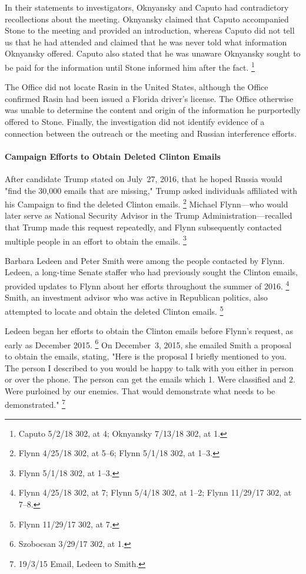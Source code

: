 In their statements to investigators, Oknyansky and Caputo had contradictory recollections about the meeting.
Oknyansky claimed that Caputo accompanied Stone to the meeting and provided an introduction, whereas Caputo did not tell us that he had attended and claimed that he was never told what information Oknyansky offered.
Caputo also stated that he was unaware Oknyansky sought to be paid for the information until Stone informed him after the fact.%
\footnote{Caputo 5/2/18 302, at 4;
Oknyansky 7/13/18 302, at 1.}

The Office did not locate Rasin in the United States, although the Office confirmed Rasin had been issued a  Florida driver's license.
The Office otherwise was unable to determine the content and origin of the information he purportedly offered to Stone.
Finally, the investigation did not identify evidence of a connection between the outreach or the meeting and Russian interference efforts.

\paragraph{Campaign Efforts to Obtain Deleted Clinton Emails}

After candidate Trump stated on July~27, 2016, that he hoped Russia would "find the 30,000 emails that are missing," Trump asked individuals affiliated with his Campaign to find the deleted Clinton emails.%
\footnote{Flynn 4/25/18 302, at 5--6;
Flynn 5/1/18 302, at 1--3.}
Michael Flynn---who would later serve as National Security Advisor in the Trump Administration---recalled that Trump made this request repeatedly, and Flynn subsequently contacted multiple people in an effort to obtain the emails.%
\footnote{Flynn 5/1/18 302, at 1--3.}

Barbara Ledeen and Peter Smith were among the people contacted by Flynn.
Ledeen, a long-time Senate staffer who had previously sought the Clinton emails, provided updates to Flynn about her efforts throughout the summer of 2016.%
\footnote{ Flynn 4/25/18 302, at 7; Flynn 5/4/18 302, at 1--2; Flynn 11/29/17 302, at 7--8.}
Smith, an investment advisor who was active in Republican politics, also attempted to locate and obtain the deleted Clinton emails.%
\footnote{ Flynn 11/29/17 302, at 7.}

Ledeen began her efforts to obtain the Clinton emails before Flynn's request, as early as December 2015.%
\footnote{Szobocsan 3/29/17 302, at 1.}
On December~3, 2015, she emailed Smith a proposal to obtain the emails, stating, "Here is the proposal I briefly mentioned to you.
The person I described to you would be happy to talk with you either in person or over the phone.
The person can get the emails which 1. Were classified and 2. Were purloined by our enemies.
That would demonstrate what needs to be demonstrated."%
\footnote{19/3/15 Email, Ledeen to Smith.}

